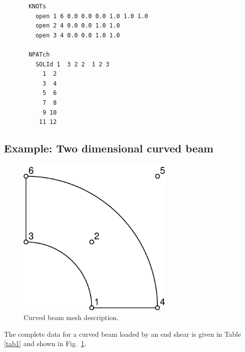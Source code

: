 \begin{minipage}{\textwidth}
\begin{verbatim}
       KNOTs
         open 1 6 0.0 0.0 0.0 1.0 1.0 1.0
         open 2 4 0.0 0.0 1.0 1.0
         open 3 4 0.0 0.0 1.0 1.0

       NPATch
         SOLId 1  3 2 2  1 2 3
           1  2
           3  4
           5  6
           7  8
           9 10
          11 12
\end{verbatim}
\end{minipage}

\subsection{Example: Two dimensional curved beam}

\begin{figure}[b!]
\begin{center}

\includegraphics[width=3in]{figs/curve_mesh}

\caption{Curved beam mesh description. \label{fig2cb} }
\end{center}
\end{figure}

The complete data for a curved beam loaded by an end shear is given in
Table \ref{tab1} and shown in Fig.\ \ref{fig2cb}.

